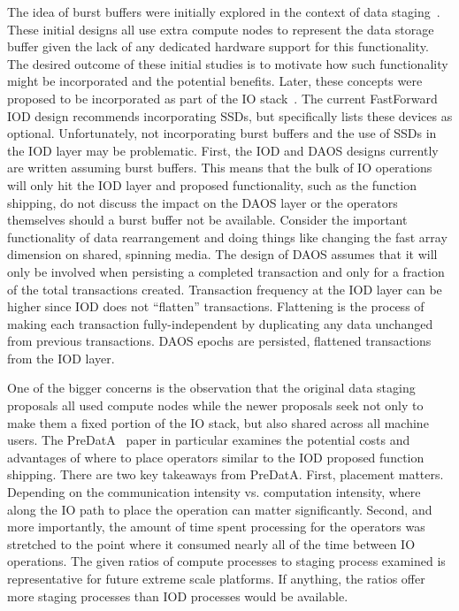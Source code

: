 \documentclass[conference]{IEEEtran}
\begin{document}
The idea of burst buffers were initially explored in the context of data
staging~\cite{abbasi:2007:datatap,Abbasi:2009:datatap,nisar:2008:staging,zheng:2010:predata}.
These initial designs all use extra compute nodes to represent the data storage
buffer given the lack of any dedicated hardware support for this functionality.
The desired outcome of these initial studies is to motivate how such
functionality might be incorporated and the potential benefits.  Later, these
concepts were proposed to be incorporated as part of the IO
stack~\cite{nowoczynski:2008:zest,bent:2012:challenges,bent:2012:burst-buffer}.
The current FastForward IOD design recommends incorporating SSDs, but
specifically lists these devices as optional. Unfortunately, not incorporating
burst buffers and the use of SSDs in the IOD layer may be problematic.  First,
the IOD and DAOS designs currently are written assuming burst buffers. This
means that the bulk of IO operations will only hit the IOD layer and proposed
functionality, such as the function shipping, do not discuss the impact on the
DAOS layer or the operators themselves should a burst buffer not be available.
Consider the important functionality of data rearrangement and doing things
like changing the fast array dimension on shared, spinning media.  The design
of DAOS assumes that it will only be involved when persisting a completed
transaction and only for a fraction of the total transactions created.
Transaction frequency at the IOD layer can be higher since IOD does not
``flatten'' transactions. Flattening is the process of making each transaction
fully-independent by duplicating any data unchanged from previous transactions.
DAOS epochs are persisted, flattened transactions from the IOD layer.

One of the bigger concerns is the observation that the original data staging
proposals all used compute nodes while the newer proposals seek not only to
make them a fixed portion of the IO stack, but also shared across all machine
users. The PreDatA~\cite{zheng:2010:predata} paper in particular examines the
potential costs and advantages of where to place operators similar to the IOD
proposed function shipping. There are two key takeaways from PreDatA. First,
placement matters.  Depending on the communication intensity vs. computation
intensity, where along the IO path to place the operation can matter
significantly. Second, and more importantly, the amount of time spent
processing for the operators was stretched to the point where it consumed
nearly all of the time between IO operations. The given ratios of compute
processes to staging process examined is representative for future extreme
scale platforms. If anything, the ratios offer more staging processes than IOD
processes would be available.
\end{document}
